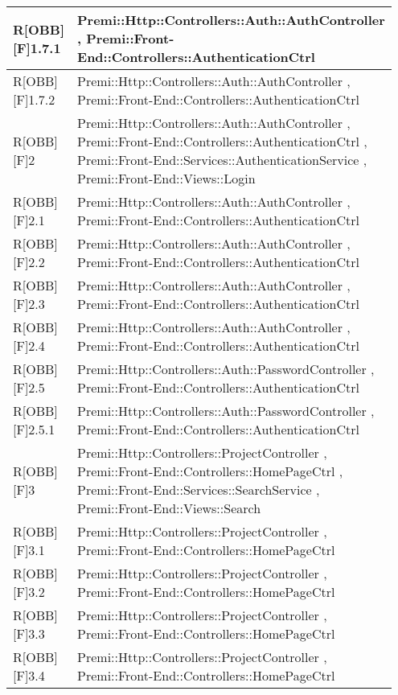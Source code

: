 \newpage
\begin{table}[h]
	\begin{center}
		\begin{tabular}{|p{0.2\linewidth}|p{0.75\linewidth}|}
			\toprule
			R[OBB][F]1.7.1 & Premi::Http::Controllers::Auth::AuthController , Premi::Front-End::Controllers::AuthenticationCtrl\\
		\midrule
			R[OBB][F]1.7.2 & Premi::Http::Controllers::Auth::AuthController , Premi::Front-End::Controllers::AuthenticationCtrl\\
		\midrule
			R[OBB][F]2 & Premi::Http::Controllers::Auth::AuthController , Premi::Front-End::Controllers::AuthenticationCtrl , Premi::Front-End::Services::AuthenticationService , Premi::Front-End::Views::Login\\
		\midrule
			R[OBB][F]2.1 & Premi::Http::Controllers::Auth::AuthController , Premi::Front-End::Controllers::AuthenticationCtrl\\
		\midrule
			R[OBB][F]2.2 & Premi::Http::Controllers::Auth::AuthController , Premi::Front-End::Controllers::AuthenticationCtrl\\
		\midrule
			R[OBB][F]2.3 & Premi::Http::Controllers::Auth::AuthController , Premi::Front-End::Controllers::AuthenticationCtrl\\
		\midrule
			R[OBB][F]2.4 & Premi::Http::Controllers::Auth::AuthController , Premi::Front-End::Controllers::AuthenticationCtrl\\
		\midrule
			R[OBB][F]2.5 & Premi::Http::Controllers::Auth::PasswordController , Premi::Front-End::Controllers::AuthenticationCtrl\\
		\midrule
			R[OBB][F]2.5.1 & Premi::Http::Controllers::Auth::PasswordController , Premi::Front-End::Controllers::AuthenticationCtrl\\
		\midrule
			R[OBB][F]3 & Premi::Http::Controllers::ProjectController , Premi::Front-End::Controllers::HomePageCtrl , Premi::Front-End::Services::SearchService , Premi::Front-End::Views::Search\\
		\midrule
			R[OBB][F]3.1 & Premi::Http::Controllers::ProjectController , Premi::Front-End::Controllers::HomePageCtrl\\
		\midrule
			R[OBB][F]3.2 & Premi::Http::Controllers::ProjectController , Premi::Front-End::Controllers::HomePageCtrl\\
		\midrule
			R[OBB][F]3.3 & Premi::Http::Controllers::ProjectController , Premi::Front-End::Controllers::HomePageCtrl\\
		\midrule
			R[OBB][F]3.4 & Premi::Http::Controllers::ProjectController , Premi::Front-End::Controllers::HomePageCtrl\\

\end{tabular}
\end{center}
\end{table}
